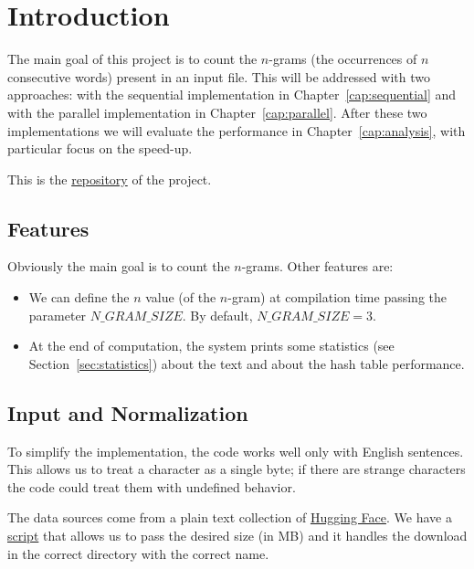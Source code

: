 \chapter{Introduction}
The main goal of this project is to count the $n$-grams (the occurrences of $n$ consecutive words) present in an input file. This will be addressed with two approaches: with the sequential implementation in Chapter~\ref{cap:sequential} and with the parallel implementation in Chapter~\ref{cap:parallel}. After these two implementations we will evaluate the performance in Chapter~\ref{cap:analysis}, with particular focus on the speed-up.

This is the \href{https://github.com/edoardosarri24/parallel-trigrams}{repository} of the project.

\section{Features}
Obviously the main goal is to count the $n$-grams. Other features are:
\begin{itemize}
    \item We can define the $n$ value (of the $n$-gram) at compilation time passing the parameter $N\_GRAM\_SIZE$. By default, $N\_GRAM\_SIZE=3$.
    \item At the end of computation, the system prints some statistics (see Section~\ref{sec:statistics}) about the text and about the hash table performance.
\end{itemize}

\section{Input and Normalization}
\label{sec:normalizzation}
To simplify the implementation, the code works well only with English sentences. This allows us to treat a character as a single byte; if there are strange characters the code could treat them with undefined behavior.

The data sources come from a plain text collection of \href{https://huggingface.co/datasets/allenai/c4/tree/main/en}{Hugging Face}. We have a \href{https://github.com/edoardosarri24/parallel-trigrams/blob/7f22592a9d7207587b74a349d66fbb2a12994c38/exec/script_download_input/main.py}{script} that allows us to pass the desired size (in MB) and it handles the download in the correct directory with the correct name.


